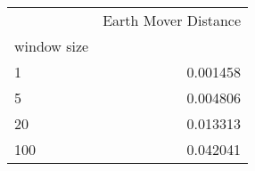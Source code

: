 \begin{tabular}{lr}
\toprule
{} &  Earth Mover Distance \\
window size &                       \\
\midrule
1           &              0.001458 \\
5           &              0.004806 \\
20          &              0.013313 \\
100         &              0.042041 \\
\bottomrule
\end{tabular}
